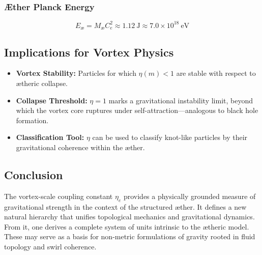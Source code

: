 \documentclass[preprint]{revtex4-2}
\begin{document}
                \subsubsection*{Æther Planck Energy}
                \begin{equation}
                E_{\text{\ae}} = M_{\text{\ae}} C_e^2 \approx \boxed{1.12~\text{J}} \approx \boxed{7.0 \times 10^{18}~\text{eV}}
                \end{equation}

                \subsection*{Implications for Vortex Physics}

                \begin{itemize}
                    \item \textbf{Vortex Stability:} Particles for which \( \eta(m) < 1 \) are stable with respect to ætheric collapse.
                    \item \textbf{Collapse Threshold:} \( \eta = 1 \) marks a gravitational instability limit, beyond which the vortex core ruptures under self-attraction—analogous to black hole formation.
                    \item \textbf{Classification Tool:} \( \eta \) can be used to classify knot-like particles by their gravitational coherence within the æther.
                \end{itemize}

                \subsection*{Conclusion}

                The vortex-scale coupling constant \( \eta_e \) provides a physically grounded measure of gravitational strength in the context of the structured æther. It defines a new natural hierarchy that unifies topological mechanics and gravitational dynamics. From it, one derives a complete system of units intrinsic to the ætheric model. These may serve as a basis for non-metric formulations of gravity rooted in fluid topology and swirl coherence.

\end{document}
